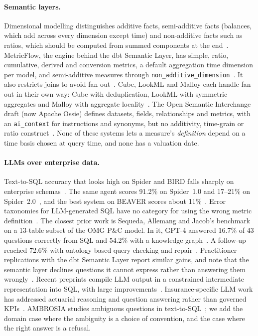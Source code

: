 \documentclass[11pt]{article}
\begin{document}
\paragraph{Semantic layers.}
Dimensional modelling distinguishes additive facts, semi-additive facts (balances, which add across every
dimension except time) and non-additive facts such as ratios, which should be computed from summed components
at the end~\cite{kimball_additive,kimball2013toolkit}. MetricFlow, the engine behind the dbt Semantic Layer,
has simple, ratio, cumulative, derived and conversion metrics, a default aggregation time dimension per model,
and semi-additive measures through \texttt{non\_additive\_dimension}~\cite{dbt_metrics_docs,dbt_measures_docs}.
It also restricts joins to avoid fan-out~\cite{dbt_joins_docs}. Cube, LookML and Malloy each handle fan-out in
their own way: Cube with deduplication, LookML with symmetric aggregates and Malloy with aggregate
locality~\cite{cube_joins_docs,looker_symmetric_docs,malloy_aggregates_docs}. The Open Semantic Interchange
draft (now Apache Ossie) defines datasets, fields, relationships and metrics, with an \texttt{ai\_context} for
instructions and synonyms, but no additivity, time-grain or ratio construct~\cite{osi_spec,osi_launch_2025}. None
of these systems lets a measure's \emph{definition} depend on a time basis chosen at query time, and none has a
valuation date.

\paragraph{LLMs over enterprise data.}
Text-to-SQL accuracy that looks high on Spider and BIRD falls sharply on enterprise
schemas~\cite{yu2018spider,li2023bird}. The same agent scores 91.2\% on Spider~1.0 and 17--21\% on
Spider~2.0~\cite{lei2025spider2}, and the best system on BEAVER scores about 11\%~\cite{chen2024beaver}.
Error taxonomies for LLM-generated SQL have no category for using the wrong metric
definition~\cite{liu2025nl2sqlbugs,shen2026icl}. The closest prior work is Sequeda, Allemang and Jacob's
benchmark on a 13-table subset of the OMG P\&C model. In it, GPT-4 answered 16.7\% of 43 questions correctly
from SQL and 54.2\% with a knowledge graph~\cite{sequeda2023benchmark,sequeda2024benchmark_grades}. A follow-up
reached 72.6\% with ontology-based query checking and repair~\cite{allemang2024ontologies}. Practitioner
replications with the dbt Semantic Layer report similar gains, and note that the semantic layer declines
questions it cannot express rather than answering them wrongly~\cite{ganz2023semanticlayer,ganz2026sltext2sql}.
Recent preprints compile LLM output in a constrained intermediate representation into SQL, with large
improvements~\cite{ai2026spc,kim2026smq,pillai2026ground,rumiantsau2026semantic,ye2026contextlayer}. Insurance-specific
LLM work has addressed actuarial reasoning and question answering rather than governed
KPIs~\cite{balona2024actuarygpt,hao2025reinsurance,chen2026insactbench,ding2025insqabench}. AMBROSIA studies
ambiguous questions in text-to-SQL~\cite{saparina2024ambrosia}; we add the domain case where the ambiguity is
a choice of convention, and the case where the right answer is a refusal.
\end{document}
